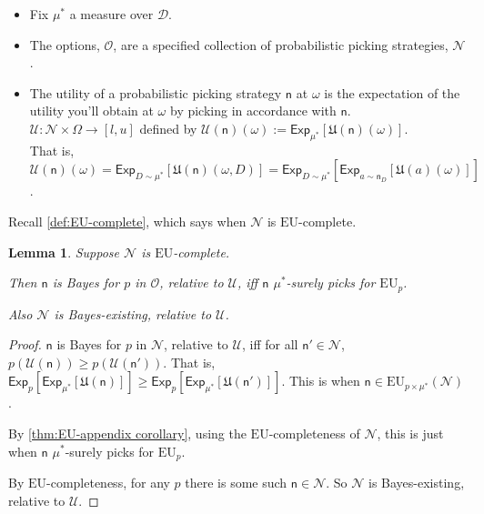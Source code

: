 \documentclass[a4paper,final]{article}
\newtheorem{lemma}[theorem]{Lemma}
\newcommand\Exp{\mathsf{Exp}}
\newcommand\EU{\mathrm{EU}}
\renewcommand\O{\mathcal{O}}
\newcommand\U{\mathfrak{U}} %
\newcommand\Uwald{\mathcal{U}} %
\newcommand{\D}{\mathcal{D}}
\newcommand{\n}{\mathsf{n}}
\renewcommand{\nu}{\n}
\newcommand\Nu{\mathcal{N}}
\renewcommand{\color}[1]{}
\newenvironment{colored}[1]{\leavevmode\color{#1}}{}
\renewcommand{\geq}{\geqslant}
\newenvironment{CCM rewritten}
{\begingroup\color{blue}} %
{\endgroup}              %
\begin{document}

\begin{itemize}
	\item Fix $\mu^*$ a measure over $\D$. 
\item The options, $\O$, are a specified collection of probabilistic picking strategies, $\Nu$.
\item The utility of a probabilistic picking strategy $\n$ at $\omega$ is the expectation of the utility you'll obtain at $\omega$ by picking in accordance with $\n$.
\\$\Uwald:\Nu\times\Omega\to[l,u]$ defined by $\Uwald(\nu)(\omega):=\Exp_{\mu^*}[\U(\nu)(\omega)]$.
\\That is, $\Uwald(\nu)(\omega)=\Exp_{D\sim \mu^*}[\U(\nu)(\omega,D)]=\Exp_{D\sim \mu^*}[\Exp_{a\sim \nu_D}[\U(a)(\omega)]]$.
\end{itemize}

Recall \cref{def:EU-complete}, which says when $\Nu$ is $\EU$-complete.%
\begin{lemma}\label{thm:cct-appln:existing}
	Suppose $\Nu$ is $\EU$-complete.
	
	Then $\nu$ is Bayes for $p$ in $\O$, relative to $\Uwald$, iff $\nu$ $\mu^*$-surely picks for $\EU_p$. 
	
	Also $\Nu$ is Bayes-existing, relative to $\Uwald$.
\end{lemma}
\begin{proof}
	$\nu$ is Bayes for $p$ in $\Nu$, relative to $\Uwald$, iff
	for all $\nu'\in\Nu$, $p(\Uwald(\nu))\geq p(\Uwald(\nu'))$. That is, $\Exp_p[\Exp_{\mu^*}[\U(\nu)]]\geq \Exp_p[\Exp_{\mu^*}[\U(\nu')]]$. 
	This is when $\nu\in\EU_{p\times\mu^*}(\Nu)$. 
	
	By \cref{thm:EU-appendix corollary}, using the $\EU$-completeness of $\Nu$, this is just when $\nu$ $\mu^*$-surely picks for $\EU_p$.
	
	By $\EU$-completeness, for any $p$ there is some such $\nu\in\Nu$. So $\Nu$ is Bayes-existing, relative to $\Uwald$. 
\end{proof}
\end{document}
